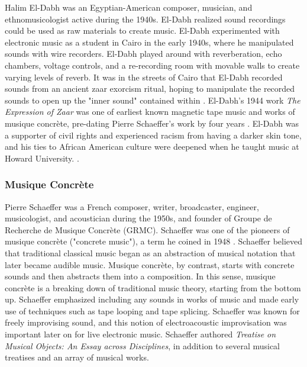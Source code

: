 \documentclass[letterpaper, 12pt]{article}
\begin{document}

%
Halim El-Dabh was an Egyptian-American composer, musician, and ethnomusicologist active during the 1940s.
%
El-Dabh realized sound recordings could be used as raw materials to create music. 
%
El-Dabh experimented with electronic music as a student in Cairo in the early 1940s, where he manipulated sounds with wire recorders.
%
El-Dabh played around with reverberation, echo chambers, voltage controls, and a re-recording room with movable walls to create varying levels of reverb.
%
It was in the streets of Cairo that El-Dabh recorded sounds from an ancient zaar exorcism ritual, hoping to manipulate the recorded sounds to open up the "inner sound" contained within \citep{holmes2008electronic}.
%
El-Dabh's 1944 work \textit{The Expression of Zaar} was one of earliest known magnetic tape music and works of musique concrète, pre-dating Pierre Schaeffer's work by four years \citep{holmes2008electronic}.
%
El-Dabh was a supporter of civil rights and experienced racism from having a darker skin tone, and his ties to African American culture were deepened when he taught music at Howard University. \citep{seachrist2003musical}.

\subsubsection{Musique Concrète}


%
Pierre Schaeffer was a French composer, writer, broadcaster, engineer, musicologist, and acoustician during the 1950s, and founder of Groupe de Recherche de Musique Concrète (GRMC).
%
Schaeffer was one of the pioneers of musique concrète ("concrete music"), a term he coined in 1948 \citep{schaeffer1992pierre}.
%
Schaeffer believed that traditional classical music began as an abstraction of musical notation that later became audible music.
%
Musique concrète, by contrast, starts with concrete sounds and then abstracts them into a composition.
%
In this sense, musique concrète is a breaking down of traditional music theory, starting from the bottom up. 
%
Schaeffer emphasized including any sounds in works of music and made early use of techniques such as tape looping and tape splicing.
%
Schaeffer was known for freely improvising sound, and this notion of electroacoustic improvisation was important later on for live electronic music.
%
Schaeffer authored \textit{Treatise on Musical Objects: An Essay across Disciplines}, in addition to several musical treatises and an array of musical works.
\end{document}
